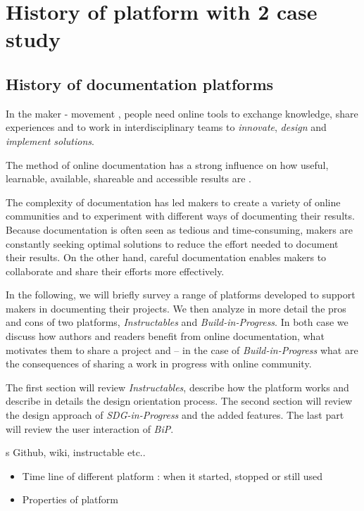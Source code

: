 \chapter{History of platform with 2 case study}

\section{History of documentation platforms}

In the maker - movement \cite{davies2017hackerspaces}, people need online tools to exchange knowledge, share experiences and to work in interdisciplinary teams to \textit{innovate}, \textit{design} and \textit{implement solutions}.

The method of online documentation has a strong influence on how useful, learnable, available, shareable and accessible results are \cite{harcourt2016re}.

The complexity of documentation has led makers to create a variety of online communities and to experiment with different ways of documenting their results. Because documentation is often seen as tedious and time-consuming, makers are constantly seeking optimal solutions to reduce the effort needed to document their results. On the other hand, careful documentation enables makers to collaborate and share their efforts more effectively.


In the following, we will briefly survey a range of platforms developed to support makers in documenting their projects. We then analyze in more detail the pros and cons of two platforms, \textit{Instructables} and \textit{Build-in-Progress}. In both case we discuss how authors and readers benefit from online documentation, what motivates them to share a project and – in the case of \textit{Build-in-Progress} what are the consequences of sharing a work in progress with online community.

The first section will review \textit{Instructables}, describe how the platform works and describe in details the design orientation process. The second section will review the design approach of \textit{SDG-in-Progress} and the added features. The last part will review the user interaction of \textit{BiP}. 


s
Github, wiki, instructable etc..

\begin{itemize}
	\item Time line of different platform : when it started, stopped or still used
	\item Properties of platform
\end{itemize}

